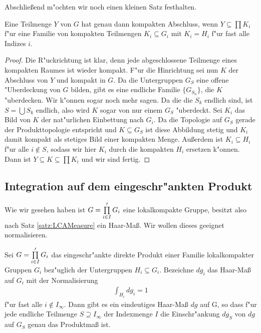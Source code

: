		Abschließend m"ochten wir noch einen kleinen Satz festhalten.
		\begin{satz}
			Eine Teilmenge $Y$ von $G$ hat genau dann kompakten Abschluss, wenn $Y \subseteq \prod{K_i}$ f"ur eine Familie von kompakten Teilmengen $K_i \subseteq G_i$ mit $K_i = H_i$ f"ur fast alle Indizes $i$.
		\end{satz}
		\begin{proof}
			Die R"uckrichtung ist klar, denn jede abgeschlossene Teilmenge eines kompakten Raumes ist wieder kompakt. 
			F"ur die Hinrichtung sei nun $K$ der Abschluss von $Y$ und kompakt in $G$. 
			Da die Untergruppen $G_S$ eine offene "Uberdeckung von $G$ bilden, gibt es eine endliche Familie $\{G_{S_n}\}$, die $K$ "uberdecken. 
			Wir k"onnen sogar noch mehr sagen. Da die die $S_k$ endlich sind, ist $S = \bigcup S_k$ endlich, also wird $K$ sogar von nur einem $G_S$ "uberdeckt. 
			Sei $K_i$ das Bild von $K$ der nat"urlichen Einbettung nach $G_i$. 
			Da die Topologie auf $G_S$ gerade der Produkttopologie entspricht und $K\subseteq G_S$ ist diese Abbildung stetig und $K_i$ damit kompakt als stetiges Bild einer kompakten Menge. Außerdem ist $K_i \subseteq H_i$ f"ur alle $i\notin S$, sodass wir hier $K_i$ durch die kompakten $H_i$ ersetzen k"onnen. Dann ist $Y\subseteq K \subseteq \prod{K_i}$ und wir sind fertig.
		\end{proof}
		
		\subsection{Integration auf dem eingeschr"ankten Produkt}
		Wie wir gesehen haben ist $G=\prod\limits_{i \in I}' G_i$ eine lokalkompakte Gruppe, besitzt also nach Satz \ref{satz:LCAMeasure} ein Haar-Maß. Wir wollen dieses geeignet normalisieren.
		\begin{satz}
			Sei $G=\prod\limits_{i \in I}' G_i$ das eingeschr"ankte direkte Produkt einer Familie lokalkompakter Gruppen $G_i$ bez"uglich der Untergruppen $H_i \subseteq G_i$. Bezeichne $dg_i$ das Haar-Maß auf $G_i$ mit der Normalisierung
			\begin{align*}
				\int_{H_i} dg_i = 1
			\end{align*}
			f"ur fast alle $i \notin I_\infty$. Dann gibt es ein eindeutiges Haar-Maß $dg$ auf G, so dass f"ur jede endliche Teilmenge $S\supseteq I_\infty$ der Indexmenge $I$ die Einschr"ankung $dg_S$ von $dg$ auf $G_S$ genau das Produktmaß ist.
		\end{satz}
		
